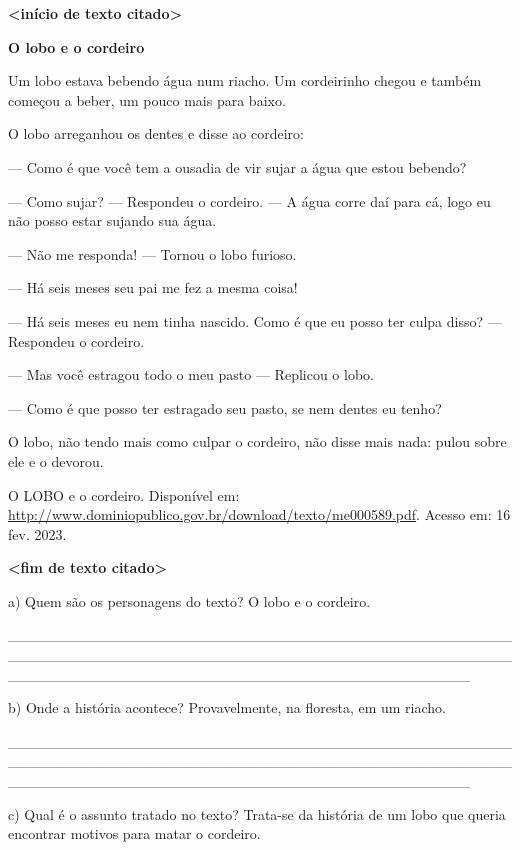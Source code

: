 \textbf{\textless{}início de texto citado\textgreater{}}

\textbf{O lobo e o cordeiro}

Um lobo estava bebendo água num riacho. Um cordeirinho chegou e também
começou a beber, um pouco mais para baixo.

O lobo arreganhou os dentes e disse ao cordeiro:

--- Como é que você tem a ousadia de vir sujar a água que estou bebendo?

--- Como sujar? --- Respondeu o cordeiro. --- A água corre daí para cá,
logo eu não posso estar sujando sua água.

--- Não me responda! --- Tornou o lobo furioso.

--- Há seis meses seu pai me fez a mesma coisa!

--- Há seis meses eu nem tinha nascido. Como é que eu posso ter culpa
disso? --- Respondeu o cordeiro.

--- Mas você estragou todo o meu pasto --- Replicou o lobo.

--- Como é que posso ter estragado seu pasto, se nem dentes eu tenho?

O lobo, não tendo mais como culpar o cordeiro, não disse mais nada:
pulou sobre ele e o devorou.

O LOBO e o cordeiro. Disponível em:
\url{http://www.dominiopublico.gov.br/download/texto/me000589.pdf}.
Acesso em: 16 fev. 2023.

\textbf{\textless{}fim de texto citado\textgreater{}}

a) Quem são os personagens do texto? O lobo e o cordeiro.

\_\_\_\_\_\_\_\_\_\_\_\_\_\_\_\_\_\_\_\_\_\_\_\_\_\_\_\_\_\_\_\_\_\_\_\_\_\_\_\_\_\_\_\_\_\_\_\_\_\_\_\_\_\_\_\_\_\_\_\_\_\_\_\_\_\_\_\_\_\_\_\_\_\_\_\_\_\_\_\_\_\_\_\_\_\_\_\_\_\_\_\_\_\_\_\_\_\_\_\_\_\_\_\_\_\_\_\_\_\_\_\_\_\_\_\_\_\_\_\_\_\_\_\_\_\_\_\_\_\_\_\_\_\_\_\_\_\_\_\_

b) Onde a história acontece? Provavelmente, na floresta, em um riacho.

\_\_\_\_\_\_\_\_\_\_\_\_\_\_\_\_\_\_\_\_\_\_\_\_\_\_\_\_\_\_\_\_\_\_\_\_\_\_\_\_\_\_\_\_\_\_\_\_\_\_\_\_\_\_\_\_\_\_\_\_\_\_\_\_\_\_\_\_\_\_\_\_\_\_\_\_\_\_\_\_\_\_\_\_\_\_\_\_\_\_\_\_\_\_\_\_\_\_\_\_\_\_\_\_\_\_\_\_\_\_\_\_\_\_\_\_\_\_\_\_\_\_\_\_\_\_\_\_\_\_\_\_\_\_\_\_\_\_\_\_

c) Qual é o assunto tratado no texto? Trata-se da história de um lobo
que queria encontrar motivos para matar o cordeiro.

